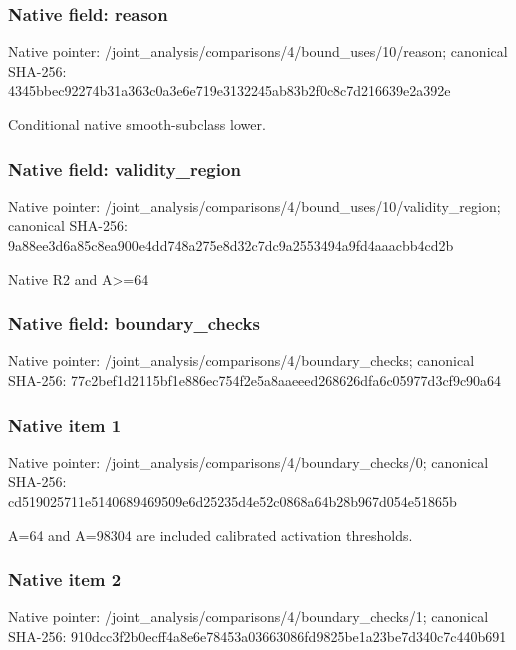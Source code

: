 \documentclass[10pt,a4paper]{article}
\begin{document}
\subsubsection{Native field: reason}
Native pointer: /joint\_\allowbreak{}analysis/comparisons/4/bound\_\allowbreak{}uses/10/reason; canonical SHA-256: 4345bbec92274b31a363c0a3e6e719e3132245ab83b2f0c8c7d216639e2a392e

\begingroup\raggedright\sloppy Conditional native smooth-subclass lower.\par\endgroup

\subsubsection{Native field: validity\_\allowbreak{}region}
Native pointer: /joint\_\allowbreak{}analysis/comparisons/4/bound\_\allowbreak{}uses/10/validity\_\allowbreak{}region; canonical SHA-256: 9a88ee3d6a85c8ea900e4dd748a275e8d32c7dc9a2553494a9fd4aaacbb4cd2b

\begingroup\raggedright\sloppy Native R2 and A>=\allowbreak{}64\par\endgroup

\subsubsection{Native field: boundary\_\allowbreak{}checks}
Native pointer: /joint\_\allowbreak{}analysis/comparisons/4/boundary\_\allowbreak{}checks; canonical SHA-256: 77c2bef1d2115bf1e886ec754f2e5a8aaeeed268626dfa6c05977d3cf9c90a64

\subsubsection{Native item 1}
Native pointer: /joint\_\allowbreak{}analysis/comparisons/4/boundary\_\allowbreak{}checks/0; canonical SHA-256: cd519025711e5140689469509e6d25235d4e52c0868a64b28b967d054e51865b

\begingroup\raggedright\sloppy A=\allowbreak{}64 and A=\allowbreak{}98304 are included calibrated activation thresholds.\par\endgroup

\subsubsection{Native item 2}
Native pointer: /joint\_\allowbreak{}analysis/comparisons/4/boundary\_\allowbreak{}checks/1; canonical SHA-256: 910dcc3f2b0ecff4a8e6e78453a03663086fd9825be1a23be7d340c7c440b691
\end{document}

